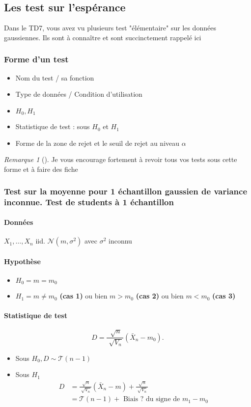 \documentclass{article}
\theoremstyle{plain}%
\theoremstyle{definition}
\theoremstyle{remark}
\newtheorem*{rem}{Remarque}
\begin{document}
\subsection{Les test sur l'espérance}
Dans le TD7, vous avez vu plusieurs test "élémentaire" sur les données gaussiennes. Ils sont à connaître et sont succinctement rappelé ici
\subsubsection{Forme d'un test} 
\begin{itemize}
    \item Nom du test / sa fonction
    \item Type de données / Condition d'utilisation
    \item $ H_0, H_1 $ 
    \item Statistique de test : sous $ H_0 $ et $ H_1 $ 
    \item Forme de la zone de rejet et le seuil de rejet au niveau $ \alpha  $ 
\end{itemize}
\begin{rem}[]
    Je vous encourage fortement à revoir tous vos tests sous cette forme et à faire des fiche
\end{rem}

\subsubsection{Test sur la moyenne pour 1 échantillon gaussien de variance inconnue. Test de students à 1 échantillon}

\paragraph*{Données} $ X_1, \dots, X_n $ iid. $ \mathcal{N}(m, \sigma ^2) $ avec $ \sigma ^2 $ inconnu

\paragraph*{Hypothèse}\begin{itemize}
    \item $ H_0 = m = m_0$ 
    \item $ H_1 = m \neq m_0$ \textbf{(cas 1)} ou bien $ m>m_0 $ \textbf{(cas 2)} ou bien $ m < m_0 $ \textbf{(cas 3)}
\end{itemize}

\paragraph*{Statistique de test}
\[
    D = \frac{\sqrt[]{n}}{\sqrt[]{V_n}}(\bar{X}_n - m_0)
.\]
\begin{itemize}
    \item Sous $ H_0, D \sim \mathcal{T}(n-1)$ 
    \item Sous $ H_1 $ \begin{align*}
        D &= \frac{\sqrt[]{n}}{\sqrt[]{V_n}} (\bar{X}_n - m) + \frac{\sqrt[]{n}}{\sqrt[]{V_n}} \\
            &= \mathcal{T}(n-1) + \text{ Biais ? du signe de } m_1 - m_0
    \end{align*}
\end{itemize}
\end{document}
